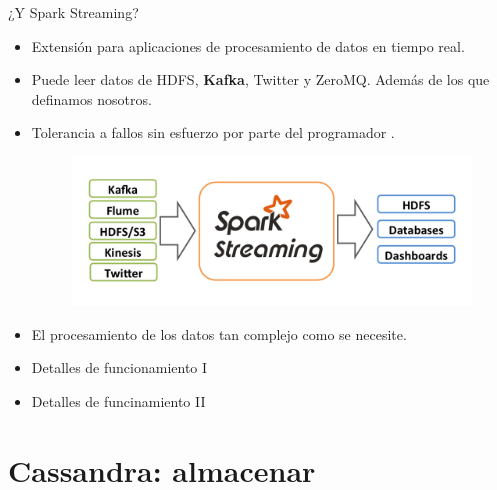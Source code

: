 \documentclass[dvipsnames]{beamer}
\begin{document}
	\begin{frame}
          ¿Y Spark Streaming?
          \begin{itemize}
          \item Extensión para aplicaciones de procesamiento de datos en tiempo real.
          \item Puede leer datos de HDFS, \textbf{Kafka}, Twitter y ZeroMQ. Además de los que definamos nosotros.
          \item Tolerancia a fallos sin esfuerzo por parte del programador \Smiley.

            \begin{figure}[H]
              \centering
              \includegraphics[scale=0.4]{img/streaming-arch.png}
            \end{figure}

            
          \item El procesamiento de los datos tan complejo como se necesite.
          \end{itemize}          
	\end{frame}

        \begin{frame}
          \begin{itemize}
          \item Detalles de funcionamiento I
          \end{itemize}
        \end{frame}

        \begin{frame}
          \begin{itemize}
          \item Detalles de funcinamiento II
          \end{itemize}
        \end{frame}
        
        \section{Cassandra: almacenar}
\end{document}
